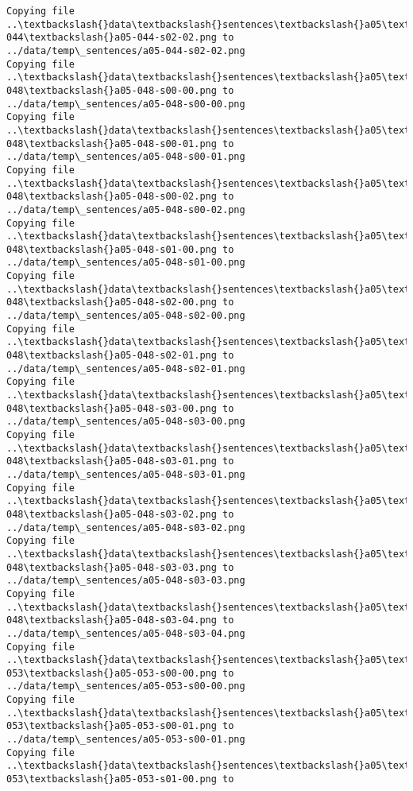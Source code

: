 \documentclass[11pt]{article}
\begin{document}
\begin{Verbatim}[commandchars=\\\{\}]
Copying file ..\textbackslash{}data\textbackslash{}sentences\textbackslash{}a05\textbackslash{}a05-044\textbackslash{}a05-044-s02-02.png to
../data/temp\_sentences/a05-044-s02-02.png
Copying file ..\textbackslash{}data\textbackslash{}sentences\textbackslash{}a05\textbackslash{}a05-048\textbackslash{}a05-048-s00-00.png to
../data/temp\_sentences/a05-048-s00-00.png
Copying file ..\textbackslash{}data\textbackslash{}sentences\textbackslash{}a05\textbackslash{}a05-048\textbackslash{}a05-048-s00-01.png to
../data/temp\_sentences/a05-048-s00-01.png
Copying file ..\textbackslash{}data\textbackslash{}sentences\textbackslash{}a05\textbackslash{}a05-048\textbackslash{}a05-048-s00-02.png to
../data/temp\_sentences/a05-048-s00-02.png
Copying file ..\textbackslash{}data\textbackslash{}sentences\textbackslash{}a05\textbackslash{}a05-048\textbackslash{}a05-048-s01-00.png to
../data/temp\_sentences/a05-048-s01-00.png
Copying file ..\textbackslash{}data\textbackslash{}sentences\textbackslash{}a05\textbackslash{}a05-048\textbackslash{}a05-048-s02-00.png to
../data/temp\_sentences/a05-048-s02-00.png
Copying file ..\textbackslash{}data\textbackslash{}sentences\textbackslash{}a05\textbackslash{}a05-048\textbackslash{}a05-048-s02-01.png to
../data/temp\_sentences/a05-048-s02-01.png
Copying file ..\textbackslash{}data\textbackslash{}sentences\textbackslash{}a05\textbackslash{}a05-048\textbackslash{}a05-048-s03-00.png to
../data/temp\_sentences/a05-048-s03-00.png
Copying file ..\textbackslash{}data\textbackslash{}sentences\textbackslash{}a05\textbackslash{}a05-048\textbackslash{}a05-048-s03-01.png to
../data/temp\_sentences/a05-048-s03-01.png
Copying file ..\textbackslash{}data\textbackslash{}sentences\textbackslash{}a05\textbackslash{}a05-048\textbackslash{}a05-048-s03-02.png to
../data/temp\_sentences/a05-048-s03-02.png
Copying file ..\textbackslash{}data\textbackslash{}sentences\textbackslash{}a05\textbackslash{}a05-048\textbackslash{}a05-048-s03-03.png to
../data/temp\_sentences/a05-048-s03-03.png
Copying file ..\textbackslash{}data\textbackslash{}sentences\textbackslash{}a05\textbackslash{}a05-048\textbackslash{}a05-048-s03-04.png to
../data/temp\_sentences/a05-048-s03-04.png
Copying file ..\textbackslash{}data\textbackslash{}sentences\textbackslash{}a05\textbackslash{}a05-053\textbackslash{}a05-053-s00-00.png to
../data/temp\_sentences/a05-053-s00-00.png
Copying file ..\textbackslash{}data\textbackslash{}sentences\textbackslash{}a05\textbackslash{}a05-053\textbackslash{}a05-053-s00-01.png to
../data/temp\_sentences/a05-053-s00-01.png
Copying file ..\textbackslash{}data\textbackslash{}sentences\textbackslash{}a05\textbackslash{}a05-053\textbackslash{}a05-053-s01-00.png to

\end{Verbatim}
\end{document}
